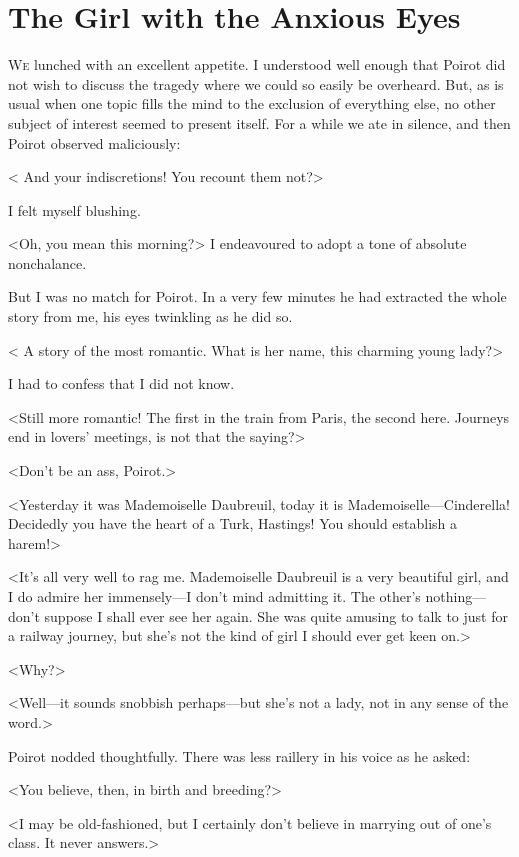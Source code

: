 \chapter{The Girl with the Anxious Eyes}

\lettrine{W}{e} lunched with an excellent appetite. I understood well enough that Poirot did not wish to discuss the tragedy where we could so easily be overheard. But, as is usual when one topic fills the mind to the exclusion of everything else, no other subject of interest seemed to present itself. For a while we ate in silence, and then Poirot observed maliciously: 

 < And your indiscretions! You recount them not?> 

 I felt myself blushing. 

 <Oh, you mean this morning?> I endeavoured to adopt a tone of absolute nonchalance. 

 But I was no match for Poirot. In a very few minutes he had extracted the whole story from me, his eyes twinkling as he did so. 

 < A story of the most romantic. What is her name, this charming young lady?> 

 I had to confess that I did not know. 

 <Still more romantic! The first  in the train from Paris, the second here. Journeys end in lovers' meetings, is not that the saying?> 

 <Don't be an ass, Poirot.> 

 <Yesterday it was Mademoiselle Daubreuil, today it is Mademoiselle—Cinderella! Decidedly you have the heart of a Turk, Hastings! You should establish a harem!> 

 <It's all very well to rag me. Mademoiselle Daubreuil is a very beautiful girl, and I do admire her immensely—I don't mind admitting it. The other's nothing—don't suppose I shall ever see her again. She was quite amusing to talk to just for a railway journey, but she's not the kind of girl I should ever get keen on.> 

 <Why?> 

 <Well—it sounds snobbish perhaps—but she's not a lady, not in any sense of the word.> 

 Poirot nodded thoughtfully. There was less raillery in his voice as he asked: 

 <You believe, then, in birth and breeding?> 

 <I may be old-fashioned, but I certainly don't believe in marrying out of one's class. It never answers.> 

